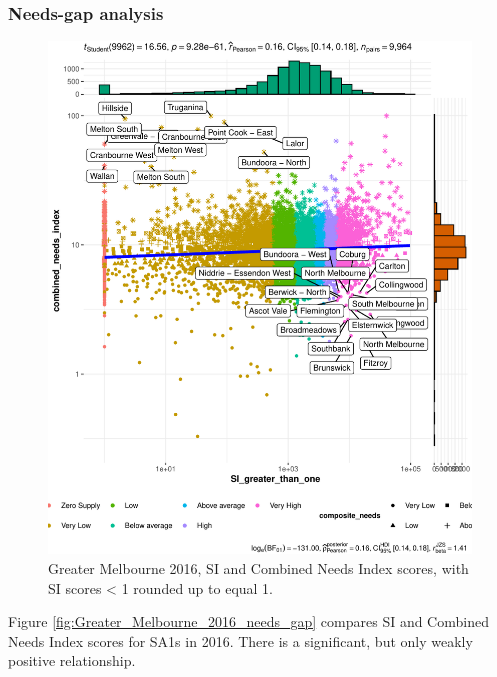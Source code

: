\documentclass[preprint, 3p,
authoryear]{elsarticle} %
\begin{document}
\subsubsection{Needs-gap analysis}\label{needs-gap-analysis-1}

\begin{figure}
\centering
\includegraphics{Leveraging_GTFS_to_assess_transit_supply_Transport_Geography_files/figure-latex/Greater_Melbourne_2016_needs_gap-1.pdf}
\caption{Greater Melbourne 2016, SI and Combined Needs Index scores,
with SI scores \textless{} 1 rounded up to equal 1.}
\end{figure}

Figure \ref{fig:Greater_Melbourne_2016_needs_gap} compares SI and
Combined Needs Index scores for SA1s in 2016. There is a significant,
but only weakly positive relationship.
\end{document}
